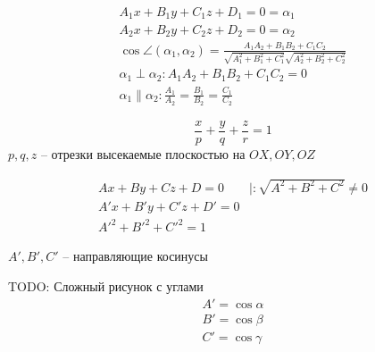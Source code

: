 \documentclass[main]{subfiles}
\begin{document}
\begin{definition}
    \begin{gather*}
        A_1x + B_1 y + C_1 z + D_1 = 0 = \alpha_1\\
        A_2x + B_2 y + C_2 z + D_2 = 0 = \alpha_2\\
        \cos\angle(\alpha_1, \alpha_2) =
        \frac{A_1 A_2 + B_1 B_2 + C_1 C_2}{\sqrt{A_1^2 + B_1^2 + C_1^2}\sqrt{A_2^2 + B_2^2 + C_2^2}}\\
        \alpha_1 \perp \alpha_2: A_1 A_2 + B_1 B_2 + C_1 C_2 = 0\\
        \alpha_1 \parallel \alpha_2: \frac{A_1}{A_2} = \frac{B_1}{B_2} = \frac{C_1}{C_2}
    \end{gather*}
\end{definition}

\begin{definition}
    \[\frac{x}{p} + \frac{y}{q} + \frac{z}{r} = 1\]
    $p,q,z$ -- отрезки высекаемые плоскостью на $OX, OY, OZ$
\end{definition}


\begin{definition}
    \begin{gather*}
        Ax + By + Cz + D = 0 \qquad |:\sqrt{A^2 + B^2 +C^2} \neq 0\\
        A'x + B'y + C'z +D' = 0\\
        A'^2 + B'^2 + C'^2 = 1
    \end{gather*}
\end{definition}

\begin{definition}
    $A', B', C'$ -- направляющие косинусы

    TODO: Сложный рисунок с углами
    \begin{gather*}
        A' = \cos \alpha\\
        B' = \cos \beta\\
        C' = \cos \gamma\\
    \end{gather*}
\end{definition}
\end{document}
